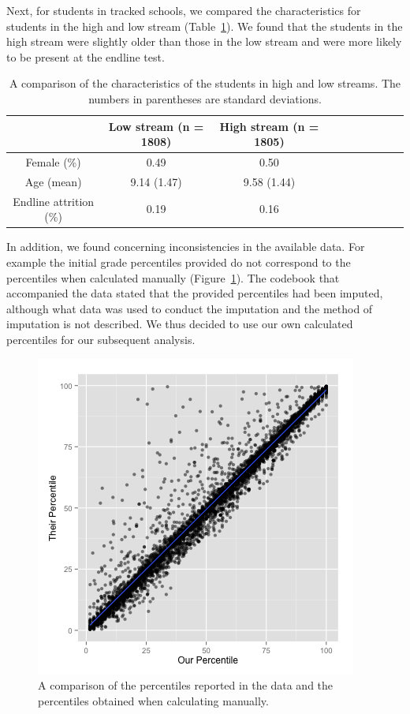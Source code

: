 \documentclass[11pt]{article}
\begin{document}
 
 \noindent Next, for students in tracked schools, we compared the characteristics for students in the high and low stream (Table~\ref{tab:charstream}). We found that the students in the high stream were slightly older than those in the low stream and were more likely to be present at the endline test.
  \begin{table}[H]
 \centering
 \begin{tabular}{cccccccccc}
 \hline
 & Low stream (n = 1808) & High stream (n = 1805)\\
 \hline
Female (\%) & 0.49 & 0.50\\
Age (mean) & 9.14 (1.47) & 9.58 (1.44)\\
Endline attrition (\%) & 0.19 & 0.16\\ \hline
 \end{tabular}
 \caption{A comparison of the characteristics of the students in high and low streams. The numbers in parentheses are standard deviations.}
 \label{tab:charstream}
 \end{table} 
 
 
 \noindent In addition, we found concerning inconsistencies in the available data. For example the initial grade percentiles provided do not correspond to the percentiles when calculated manually (Figure~\ref{fig:percentile}). The codebook that accompanied the data stated that the provided percentiles had been imputed, although what data was used to conduct the imputation and the method of imputation is not described. We thus decided to use our own calculated percentiles for our subsequent analysis.
 
 
 \begin{figure}[H]
\centering
\includegraphics[scale=0.6]{Score_vs_Percentile.png}
\caption{A comparison of the percentiles reported in the data and the percentiles obtained when calculating manually.}
\label{fig:percentile}
\end{figure} 
\end{document}

